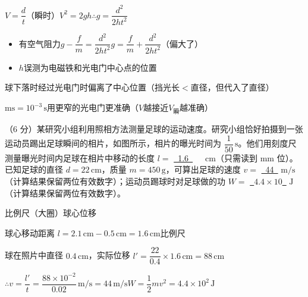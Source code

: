 $V=\dfrac{d}{t}$（瞬时）\qquad $V^2=2gh$\qquad $\therefore g=\dfrac{d^2}{2ht^2}$

\begin{itemize}
\item 有空气阻力\quad $g-\dfrac{f}{m}=\dfrac{d^2}{2ht^2}$\quad $g=\dfrac{f}{m}+\dfrac{d^2}{2ht^2}$（偏大了）
\item $h$误测为电磁铁和光电门中心点的位置\quad {}
\end{itemize}

球下落时经过光电门时偏离了中心位置（挡光长$<$直径，但代入了直径）\quad {}

$\mathrm{ms}=10^{-3}\,\mathrm{s}$\quad 用更窄的光电门更准确（$V$越接近$V_{\text{瞬}}$越准确）

\begin{problem}
（6 分）某研究小组利用照相方法测量足球的运动速度。研究小组恰好拍摄到一张运动员踢出足球瞬间的相片，如图所示，相片的曝光时间为 $\dfrac{1}{50}\,\mathrm{s}$。他们用刻度尺测量曝光时间内足球在相片中移动的长度 $l=$ \underline{\ 1.6\ }\ \ \ $\mathrm{cm}$（只需读到 mm 位）。已知足球的直径 $d=22\,\mathrm{cm}$，质量 $m=450\,\mathrm{g}$，可算出足球的速度 $v=$ \underline{\ 44\ } $\mathrm{m/s}$（计算结果保留两位有效数字）；运动员踢球时对足球做的功 $W=$ \underline{\ $4.4\times10$\ } $\mathrm{J}$（计算结果保留两位有效数字）。


\begin{solution}
比例尺（大圈）\quad 球心位移

球心移动距离 $l=2.1\,\mathrm{cm}-0.5\,\mathrm{cm}=1.6\,\mathrm{cm}$\qquad 比例尺

球在照片中直径 $0.4\,\mathrm{cm}$，实际位移 $l'=\dfrac{22}{0.4}\times1.6\,\mathrm{cm}=88\,\mathrm{cm}$

$\therefore v=\dfrac{l'}{t}=\dfrac{88\times10^{-2}}{0.02}\,\mathrm{m/s}=44\,\mathrm{m/s}$\qquad $W=\dfrac12mv^2=4.4\times10^2\,\mathrm{J}$
\end{solution}
\end{problem}


